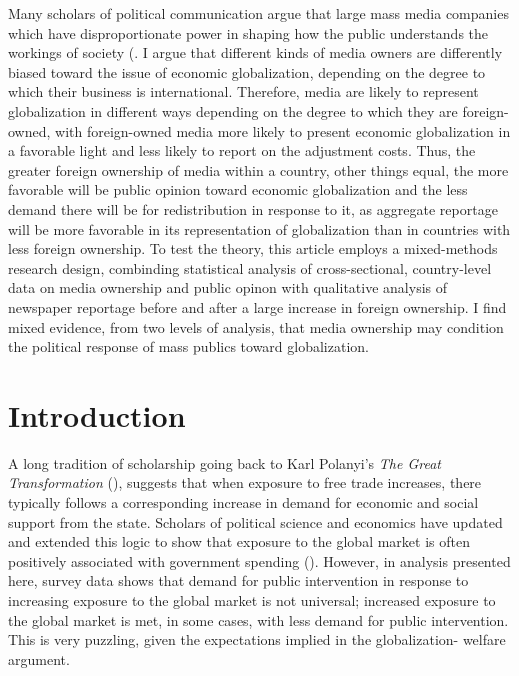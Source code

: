 \documentclass[12pt]{report}
\begin{document}
Many scholars of political communication argue that large mass media companies which have disproportionate power in shaping how the public understands the workings of society (\citealt{Baker:2006te,Bagdikian:1980ci,Ben:1990tw}. I argue that different kinds of media owners are differently biased toward the issue of economic globalization, depending on the degree to which their business is international. Therefore, media are likely to represent globalization in different ways depending on the degree to which they are foreign-owned, with foreign-owned media more likely to present economic globalization in a favorable light and less likely to report on the adjustment costs. Thus, the greater foreign ownership of media within a country, other things equal, the more favorable will be public opinion toward economic globalization and the less demand there will be for redistribution in response to it, as aggregate reportage will be more favorable in its representation of globalization than in countries with less foreign ownership. To test the theory, this article employs a mixed-methods research design, combinding statistical analysis of cross-sectional, country-level data on media ownership and public opinon with qualitative analysis of newspaper reportage before and after a large increase in foreign ownership. I find mixed evidence, from two levels of analysis, that media ownership may condition the political response of mass publics toward globalization.

\section{Introduction}

A long tradition of scholarship going back to Karl Polanyi's \emph{The Great Transformation}
(\citeyear{Polanyi:2001vc}), suggests that when exposure to free trade increases, there typically
follows a corresponding increase in demand for economic and social support from the state. Scholars
of political science and economics have updated and extended this logic to show that exposure to the
global market is often positively associated with government spending (\citealt{Adsera:2002vt,
Cameron:1978vb, Garrett:1998wl,Rodrik:1998te}). However, in analysis presented here, survey data
shows that demand for public intervention in response to increasing exposure to the global market is
not universal; increased exposure to the global market is met, in some cases, with less demand for
public intervention. This is very puzzling, given the expectations implied in the globalization-
welfare argument.
\end{document}
